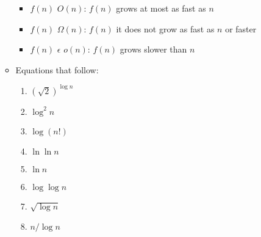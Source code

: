 \documentclass{article}[12pt]
\newcommand\encircle[1]{\raisebox{.5pt}{\textcircled{\raisebox{-.9pt} {\footnotesize #1}}} }
\begin{document}
\begin{enumerate}[label=(\arabic*)]
\begin{itemize}
        \begin{itemize}
          \item $f(n)$ \epsilon $O(n)$: $f(n)$ grows at most as fast as $n$
          \item $f(n)$ \epsilon $\Omega(n)$: $f(n)$ it does not grow as fast as $n$ or faster
          \item $f(n)$ $\epsilon$  $o(n)$: $f(n)$ grows slower than $n$
        \end{itemize}
      \item Equations that follow:
\begin{center}
\begin{multicols}{4}
\begin{enumerate}[label=\encircle{\arabic*}]
  \item $(\sqrt{2})^{\log n}$
  \item $\log^2n$
  \item $\log(n!)$
  \item $\ln\ln n$
  \item $\ln n$
  \item $\log \log n$
  \item $\sqrt{\log n}$
  \item $n/\log n$
\end{enumerate}
\end{multicols}
\end{center}

    \end{itemize}


\end{enumerate}
\end{document}
